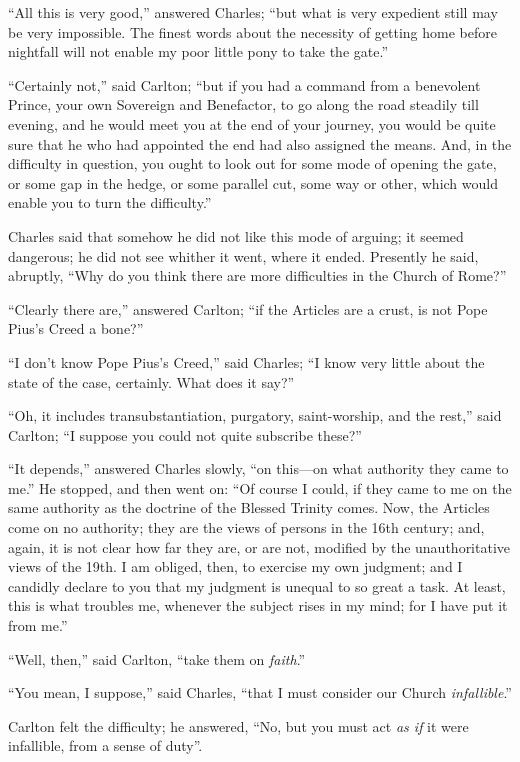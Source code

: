 ``All this is very good,'' answered Charles; ``but what
is very expedient still may be very impossible. The finest words about
the necessity of getting home before nightfall will not enable my poor
little pony to take the gate.''

``Certainly not,'' said Carlton; ``but if you had a
command from a benevolent Prince, your own Sovereign and Benefactor,
to go along the road steadily till evening, and he would meet you at
the end of your journey, you would be quite sure that he who had
appointed the end had also assigned the means. And, in the difficulty
in question, you ought to look out for some mode of opening the gate,
or some gap in the hedge, or some parallel cut, some way or other,
which would enable you to turn the difficulty.''

Charles said that somehow he did not like this mode of arguing; it
seemed dangerous; he did not see whither it went, where it ended.
Presently he said, abruptly, ``Why do you think there are more
difficulties in the Church of Rome?''

``Clearly there are,'' answered Carlton; ``if the
Articles are a crust, is not Pope Pius's Creed a bone?''

``I don't know Pope Pius's Creed,'' said Charles; ``I
know very little about the state of the case, certainly. What does it
say?''

``Oh, it includes transubstantiation, purgatory, saint-worship,
and the rest,'' said Carlton; ``I suppose you could not quite
subscribe these?''

``It depends,'' answered Charles slowly, ``on this—on
what authority they came to me.'' He stopped, and then went on:
``Of course I could, if they came to me on the same authority as
the doctrine of the Blessed Trinity comes. Now, the Articles come on
no authority; they are the views of persons in the 16th century; and,
again, it is not clear how far they are, or are not, modified by the
unauthoritative views of the 19th. I am obliged, then, to exercise my
own judgment; and I candidly declare to you that my judgment is
unequal to so great a task. At least, this is what troubles me,
whenever the subject rises in my mind; for I have put it from
me.''

``Well, then,'' said Carlton, ``take them on \emph{faith}.''

``You mean, I suppose,'' said Charles, ``that I must
consider our Church \emph{infallible}.''

Carlton felt the difficulty; he answered, ``No, but you must
act \emph{as if} it were infallible, from a sense of duty''.

